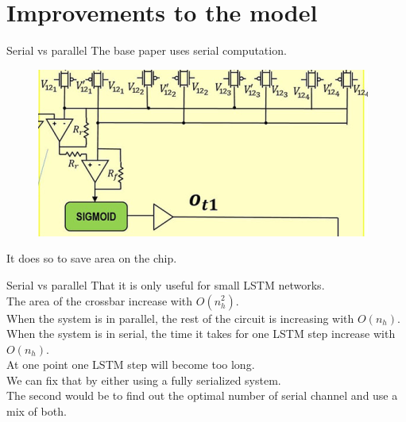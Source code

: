 \documentclass{beamer}
\begin{document}
\section{Improvements to the model}
\begin{frame}{Serial vs parallel}
    The base paper uses serial computation.
    \begin{figure}
        \centering
        \includegraphics[height=0.5\textheight]{figures/parallel.png}
    \end{figure}
    It does so to save area on the chip.
\end{frame}
\begin{frame}{Serial vs parallel}
    That it is only useful for small LSTM networks.\\
    The area of the crossbar increase with $O(n_h^2)$.\\
    When the system is in parallel, the rest of the circuit is increasing with $O(n_h)$.\\
    When the system is in serial, the time it takes for one LSTM step increase with $O(n_h)$.\\
    At one point one LSTM step will become too long.\\
    We can fix that by either using a fully serialized system.\\
    The second would be to find out the optimal number of serial channel and use a mix of both.
\end{frame}
\end{document}

